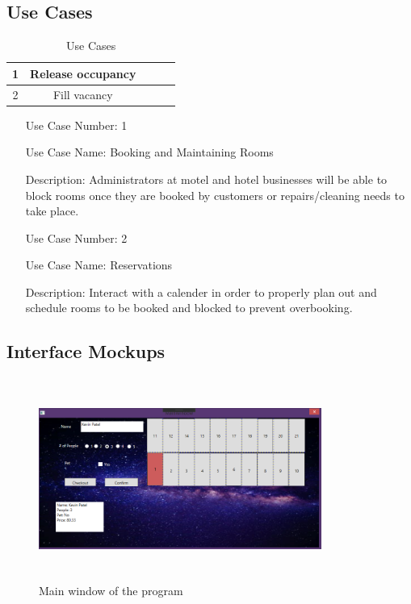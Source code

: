 \documentclass[10pt,conference,onecolumn,compsoc]{IEEEtran}
\begin{document}
\subsection{Use Cases}

\begin{table}
\centering
\begin{tabular}{|c|c|c|c|c|}
\hline
1 & Release occupancy\\
\hline \hline
2 & Fill vacancy\\
\hline

\end{tabular}
\caption{Use Cases}
\label{tab:useCaseIndex}
\end{table}


\begin{itemize}
\item[Use Case Number:] 1
\item[Use Case Name:] Booking and Maintaining Rooms
\item[Description:] Administrators at motel and hotel businesses will be able to block rooms once they are booked by customers or repairs/cleaning needs to take place.

\item[Use Case Number:] 2
\item[Use Case Name:] Reservations
\item[Description:] Interact with a calender in order to properly plan out and schedule rooms to be booked and blocked to prevent overbooking.
\end{itemize}

\subsection{Interface Mockups}
\begin{figure}[ht!]
\includegraphics[height=250px, width=350px]{Main.png}
\caption{Main window of the program}
\label{Interface}
\end{figure}
\end{document}
